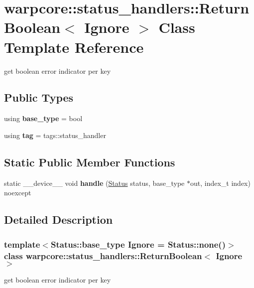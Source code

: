 \hypertarget{classwarpcore_1_1status__handlers_1_1ReturnBoolean}{}\section{warpcore\+:\+:status\+\_\+handlers\+:\+:Return\+Boolean$<$ Ignore $>$ Class Template Reference}
\label{classwarpcore_1_1status__handlers_1_1ReturnBoolean}


get boolean error indicator per key  


\subsection*{Public Types}
\begin{DoxyCompactItemize}
\item 
\mbox{\label{classwarpcore_1_1status__handlers_1_1ReturnBoolean_a885ffca419f7ddd1207042efc7dc989d}} 
using {\bfseries base\+\_\+type} = bool
\item 
\mbox{\label{classwarpcore_1_1status__handlers_1_1ReturnBoolean_af33fe79be2f6e3936f814c91ebbee72b}} 
using {\bfseries tag} = tags\+::status\+\_\+handler
\end{DoxyCompactItemize}
\subsection*{Static Public Member Functions}
\begin{DoxyCompactItemize}
\item 
\mbox{\label{classwarpcore_1_1status__handlers_1_1ReturnBoolean_a940ef121b25a49f172f5cf369477c799}} 
static \+\_\+\+\_\+device\+\_\+\+\_\+ void {\bfseries handle} (\hyperlink{classwarpcore_1_1Status}{Status} status, base\+\_\+type $\ast$out, index\+\_\+t index) noexcept
\end{DoxyCompactItemize}


\subsection{Detailed Description}
\subsubsection*{template$<$Status\+::base\+\_\+type Ignore = Status\+::none()$>$\newline
class warpcore\+::status\+\_\+handlers\+::\+Return\+Boolean$<$ Ignore $>$}

get boolean error indicator per key 